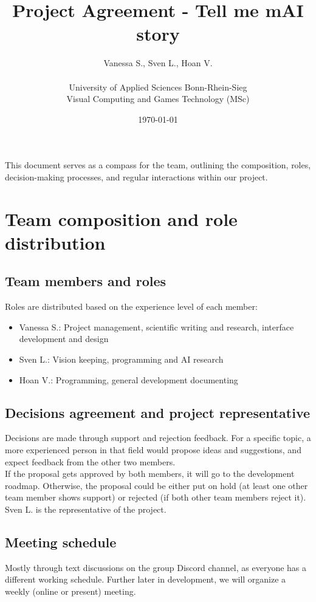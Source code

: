 \documentclass{article}
\title{Project Agreement - Tell me mAI story}
\author{Vanessa S., Sven L., Hoan V. \\\\ University of Applied Sciences Bonn-Rhein-Sieg \\ Visual Computing and Games Technology (MSc)}
\date{\today}
\begin{document}
\maketitle

This document serves as a compass for the team, outlining the composition, roles, decision-making processes, and regular interactions within our project.
\section{Team composition and role distribution}
\subsection{Team members and roles}
Roles are distributed based on the experience level of each member: 
\begin{itemize}
    \item Vanessa S.: Project management, scientific writing and research, interface development and design
    \item Sven L.: Vision keeping, programming and AI research
    \item Hoan V.: Programming, general development documenting
\end{itemize}

\subsection{Decisions agreement and project representative}
Decisions are made through support and rejection feedback.
For a specific topic, a more experienced person in that field would propose ideas and suggestions, and expect feedback from the other two members. \\

If the proposal gets approved by both members, it will go to the development roadmap.
Otherwise, the proposal could be either put on hold (at least one other team member shows support) or rejected (if both other team members reject it).\\

Sven L. is the representative of the project.

\subsection{Meeting schedule}
Mostly through text discussions on the group Discord channel, as everyone has a different working schedule.
Further later in development, we will organize a weekly (online or present) meeting.
\end{document}
